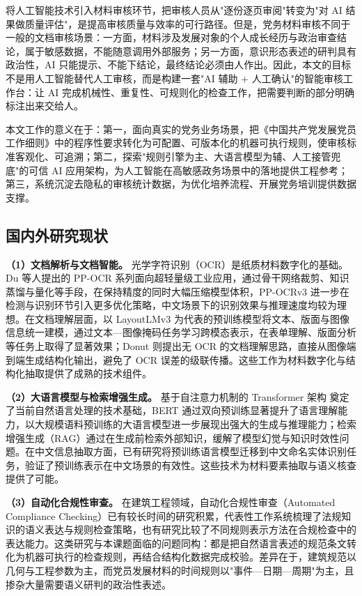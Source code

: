 \documentclass[12pt,a4paper]{ctexart}
\begin{document}
将人工智能技术引入材料审核环节，把审核人员从"逐份逐页审阅"转变为"对 AI 结果做质量评估"，是提高审核质量与效率的可行路径。但是，党务材料审核不同于一般的文档审核场景：一方面，材料涉及发展对象的个人成长经历与政治审查结论，属于敏感数据，不能随意调用外部服务；另一方面，意识形态表述的研判具有政治性，AI 只能提示、不能下结论，最终结论必须由人作出。因此，本文的目标不是用人工智能替代人工审核，而是构建一套"AI 辅助 + 人工确认"的智能审核工作台：让 AI 完成机械性、重复性、可规则化的检查工作，把需要判断的部分明确标注出来交给人。

本文工作的意义在于：第一，面向真实的党务业务场景，把《中国共产党发展党员工作细则》中的程序性要求转化为可配置、可版本化的机器可执行规则，使审核标准客观化、可追溯；第二，探索"规则引擎为主、大语言模型为辅、人工接管兜底"的可信 AI 应用架构，为人工智能在高敏感政务场景中的落地提供工程参考；第三，系统沉淀去隐私的审核统计数据，为优化培养流程、开展党务培训提供数据支撑。

\subsection{国内外研究现状}

\textbf{（1）文档解析与文档智能。} 光学字符识别（OCR）是纸质材料数字化的基础。Du 等人提出的 PP-OCR 系列面向超轻量级工业应用，通过骨干网络裁剪、知识蒸馏与量化等手段，在保持精度的同时大幅压缩模型体积，PP-OCRv3 进一步在检测与识别环节引入更多优化策略，中文场景下的识别效果与推理速度均较为理想\cite{ppocr2020,ppocrv3_2022}。在文档理解层面，以 LayoutLMv3 为代表的预训练模型将文本、版面与图像信息统一建模，通过文本—图像掩码任务学习跨模态表示，在表单理解、版面分析等任务上取得了显著效果\cite{layoutlmv3_2022}；Donut 则提出无 OCR 的文档理解思路，直接从图像端到端生成结构化输出，避免了 OCR 误差的级联传播\cite{donut_2021}。这些工作为材料数字化与结构化抽取提供了成熟的技术组件。

\textbf{（2）大语言模型与检索增强生成。} 基于自注意力机制的 Transformer 架构\cite{vaswani_2017} 奠定了当前自然语言处理的技术基础，BERT 通过双向预训练显著提升了语言理解能力\cite{bert_2019}，以大规模语料预训练的大语言模型进一步展现出强大的生成与推理能力；检索增强生成（RAG）通过在生成前检索外部知识，缓解了模型幻觉与知识时效性问题\cite{rag_2020}。在中文信息抽取方面，已有研究将预训练语言模型迁移到中文命名实体识别任务，验证了预训练表示在中文场景的有效性\cite{cner_2019}。这些技术为材料要素抽取与语义核查提供了可能。

\textbf{（3）自动化合规性审查。} 在建筑工程领域，自动化合规性审查（Automated Compliance Checking）已有较长时间的研究积累，代表性工作系统梳理了法规知识的语义表达与规则检查策略\cite{acc_2015}，也有研究比较了不同规则表示方法在合规检查中的表达能力\cite{acc_2022}。这类研究与本课题面临的问题同构：都是把自然语言表述的规范条文转化为机器可执行的检查规则，再结合结构化数据完成校验。差异在于，建筑规范以几何与工程参数为主，而党员发展材料的时间规则以"事件—日期—周期"为主，且掺杂大量需要语义研判的政治性表述。
\end{document}
